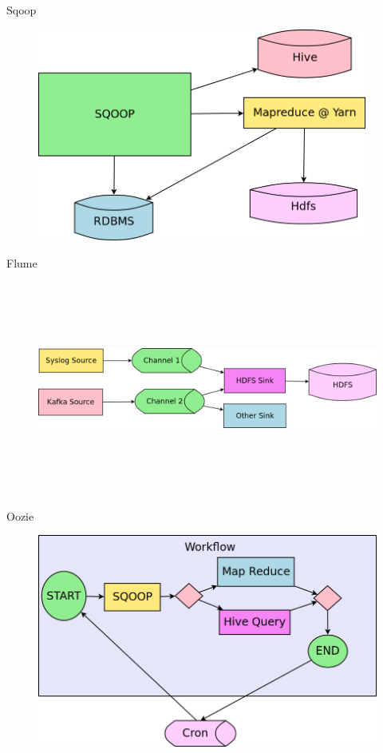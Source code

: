 \documentclass{beamer}
\begin{document}
\begin{frame}{Sqoop}
	\begin{figure}
		\includegraphics[width=\textwidth,height=7cm,keepaspectratio=true]{sqoop}
	\end{figure}
\end{frame}
\begin{frame}{Flume}
	\begin{figure}
		\includegraphics[width=\textwidth,height=7cm,keepaspectratio=true]{flume}
	\end{figure}
\end{frame}
\begin{frame}{Oozie}
	\begin{figure}
		\includegraphics[width=\textwidth,height=7cm,keepaspectratio=true]{oozie}
	\end{figure}
\end{frame}
\end{document}

